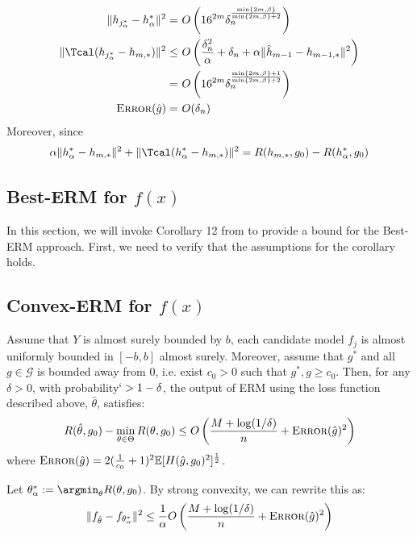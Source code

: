 \documentclass[12pt]{extarticle} %
\newcommand{\E}{\mathbb{E}}
\newcommand{\error}{\ensuremath{\textsc{Error}}}
\begin{document}
\begin{align*}
    \|h_{j^*_{\alpha}}-h_{\alpha}^*\|^2 =~& O\left(16^{2m}\delta_n^{\frac{\min\{2m,\beta\}}{\min\{2m,\beta\}+2}}\right)\\
    \|\Tcal (h_{j^*_{\alpha}}-h_{m,*})\|^2 \leq~& O\left(\frac{\delta_n^2}{\alpha} + \delta_n + \alpha \|\hat{h}_{m-1}-h_{m-1,*}\|^2 \right)\\
    =~&O\left(16^{2m}\delta_n^{\frac{\min\{2m,\beta\}+1}{\min\{2m,\beta\}+2}}\right)\\
    \error(\hat{g}) =~& O(\delta_n)
\end{align*}
Moreover, since
\begin{align*}
    \alpha \|h_{\alpha}^* - h_{m,*}\|^2 + \|\Tcal (h_{\alpha}^* - h_{m,*})\|^2 = R(h_{m,*},g_0) - R(h_{\alpha}^*,g_0)
\end{align*}

\subsection{Best-ERM for $f(x)$}
In this section, we will invoke Corollary 12 from \cite{lan2023causal} to provide a bound for the Best-ERM approach. First, we need to verify that the assumptions for the corollary holds. 

\subsection{Convex-ERM for $f(x)$}
\begin{theorem}\label{convex-erm}
Assume that $Y$ is almost surely bounded by $b$, each candidate model $f_j$ is almost uniformly bounded in $[-b,b]$ almost surely. Moreover, assume that $g^*$ and all $g\in \mathcal{G}$ is bounded away from 0, i.e. exist $c_0>0$ such that $g^*, g\geq c_0$. Then, for any $\delta>0$, with probability$`>1-\delta$, the output of ERM using the loss function described above, $\hat{\theta}$, satisfies:
\begin{align*}
    R(\hat{\theta},g_0) - \min_{\theta\in\Theta}R(\theta,g_0) \leq O\left(\frac{M+\log(1/\delta)}{n} + \error(\hat{g})^2\right)
\end{align*} 
where $\error(\hat{g}) = 2(\frac{1}{c_0}+1)^2\E[H(\hat{g},g_0)^2]^\frac{1}{2}$.
\end{theorem}
Let $\theta^*_\alpha:=\argmin_{\theta}R(\theta, g_0)$. By strong convexity, we can rewrite this as:
\begin{align*}
\|f_{\hat{\theta}} - f_{\theta^*_\alpha}\|^2 \leq \frac{1}{\alpha} O\left(\frac{M+\log(1/\delta)}{n} + \error(\hat{g})^2\right)
\end{align*}
\end{document}

